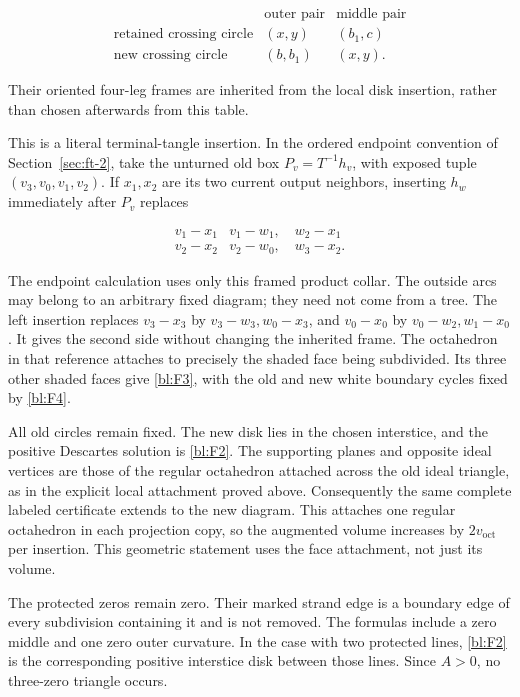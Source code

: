 \begin{equation}\label{bl:F3}
\begin{array}{c|c|c}
 &\text{outer pair}&\text{middle pair}\\ \hline
\text{retained crossing circle}&(x,y)&(b_1,c)\\
\text{new crossing circle}&(b,b_1)&(x,y).
\end{array}
\end{equation}

Their oriented four-leg frames are inherited from the local disk
insertion, rather than chosen afterwards from this table.

This is a literal terminal-tangle insertion. In the ordered endpoint convention of Section~\ref{sec:ft-2}, take the unturned
old box \(P_v=T^{-1}h_v\), with exposed tuple
\((v_3,v_0,v_1,v_2)\). If \(x_1,x_2\) are its two current output
neighbors, inserting \(h_w\) immediately after \(P_v\) replaces

\begin{equation}\label{bl:F4}
\begin{array}{c|c}
v_1-x_1&v_1-w_1,\quad w_2-x_1\\
v_2-x_2&v_2-w_0,\quad w_3-x_2.
\end{array}
\end{equation}

The endpoint calculation uses only this framed product collar. The
outside arcs may belong to an arbitrary fixed diagram; they need not
come from a tree. The left insertion replaces \(v_3-x_3\) by \(v_3-w_3,w_0-x_3\), and \(v_0-x_0\) by \(v_0-w_2,w_1-x_0\). It gives the second side without changing the inherited frame.
The octahedron in that reference attaches to precisely the shaded face
being subdivided. Its three other shaded faces give \eqref{bl:F3}, with the old
and new white boundary cycles fixed by \eqref{bl:F4}.

All old circles remain fixed. The new disk lies in the chosen
interstice, and the positive Descartes solution is \eqref{bl:F2}. The supporting
planes and opposite ideal vertices are those of the regular octahedron
attached across the old ideal triangle, as in the explicit local
attachment proved above.
Consequently the same complete labeled certificate extends to the new
diagram. This attaches one regular octahedron in each projection copy,
so the augmented volume increases by \(2v_{\mathrm{oct}}\) per insertion.
This geometric statement uses the face attachment, not just its volume.

The protected zeros remain zero. Their marked strand edge is a boundary
edge of every subdivision containing it and is not removed. The
formulas include a zero middle and one zero outer curvature. In the
case with two protected lines, \eqref{bl:F2} is the corresponding positive
interstice disk between those lines. Since \(A>0\), no three-zero
triangle occurs.

